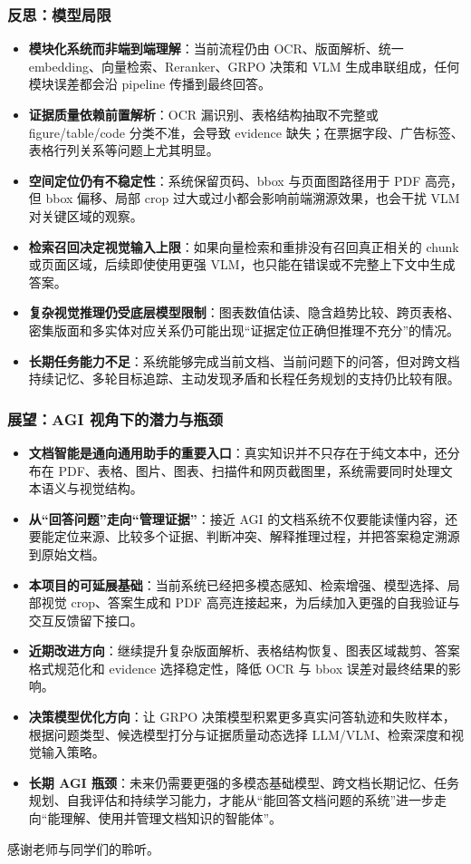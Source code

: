 \documentclass[AutoFakeBold,AutoFakeSlant]{beamer}
\begin{document}
\begin{frame}
  \frametitle{反思：模型局限}
  \scriptsize
  \begin{itemize}
    \item \textbf{模块化系统而非端到端理解}：当前流程仍由 OCR、版面解析、统一 embedding、向量检索、Reranker、GRPO 决策和 VLM 生成串联组成，任何模块误差都会沿 pipeline 传播到最终回答。
    \item \textbf{证据质量依赖前置解析}：OCR 漏识别、表格结构抽取不完整或 figure/table/code 分类不准，会导致 evidence 缺失；在票据字段、广告标签、表格行列关系等问题上尤其明显。
    \item \textbf{空间定位仍有不稳定性}：系统保留页码、bbox 与页面图路径用于 PDF 高亮，但 bbox 偏移、局部 crop 过大或过小都会影响前端溯源效果，也会干扰 VLM 对关键区域的观察。
    \item \textbf{检索召回决定视觉输入上限}：如果向量检索和重排没有召回真正相关的 chunk 或页面区域，后续即使使用更强 VLM，也只能在错误或不完整上下文中生成答案。
    \item \textbf{复杂视觉推理仍受底层模型限制}：图表数值估读、隐含趋势比较、跨页表格、密集版面和多实体对应关系仍可能出现“证据定位正确但推理不充分”的情况。
    \item \textbf{长期任务能力不足}：系统能够完成当前文档、当前问题下的问答，但对跨文档持续记忆、多轮目标追踪、主动发现矛盾和长程任务规划的支持仍比较有限。
  \end{itemize}
\end{frame}

\begin{frame}
  \frametitle{展望：AGI 视角下的潜力与瓶颈}
  \scriptsize
  \begin{itemize}
    \item \textbf{文档智能是通向通用助手的重要入口}：真实知识并不只存在于纯文本中，还分布在 PDF、表格、图片、图表、扫描件和网页截图里，系统需要同时处理文本语义与视觉结构。
    \item \textbf{从“回答问题”走向“管理证据”}：接近 AGI 的文档系统不仅要能读懂内容，还要能定位来源、比较多个证据、判断冲突、解释推理过程，并把答案稳定溯源到原始文档。
    \item \textbf{本项目的可延展基础}：当前系统已经把多模态感知、检索增强、模型选择、局部视觉 crop、答案生成和 PDF 高亮连接起来，为后续加入更强的自我验证与交互反馈留下接口。
    \item \textbf{近期改进方向}：继续提升复杂版面解析、表格结构恢复、图表区域裁剪、答案格式规范化和 evidence 选择稳定性，降低 OCR 与 bbox 误差对最终结果的影响。
    \item \textbf{决策模型优化方向}：让 GRPO 决策模型积累更多真实问答轨迹和失败样本，根据问题类型、候选模型打分与证据质量动态选择 LLM/VLM、检索深度和视觉输入策略。
    \item \textbf{长期 AGI 瓶颈}：未来仍需要更强的多模态基础模型、跨文档长期记忆、任务规划、自我评估和持续学习能力，才能从“能回答文档问题的系统”进一步走向“能理解、使用并管理文档知识的智能体”。
  \end{itemize}
  \vspace{0.15cm}
  \begin{center}
    感谢老师与同学们的聆听。
  \end{center}
\end{frame}
\end{document}
